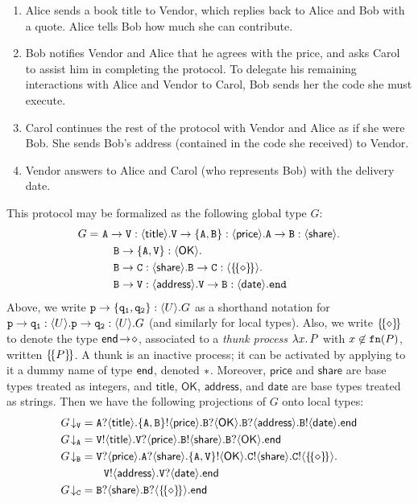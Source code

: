 \documentclass[runningheads,plain]{llncs}
\begin{document}
\begin{enumerate}[1.]
\item Alice sends a book title to Vendor, which replies back to Alice and Bob with a quote. Alice tells Bob how much she can contribute.
\item Bob notifies Vendor and Alice that he agrees with the price, and asks Carol to assist him in completing the protocol. 
To delegate his remaining interactions with Alice and Vendor to Carol, Bob sends her %
the code she must execute.
\item Carol continues the rest of the protocol with Vendor and Alice as if she were Bob. 
She sends Bob's address (contained in the  code she received) to Vendor.
\item Vendor answers to Alice and Carol (who represents Bob) with the delivery date.
\end{enumerate}
This protocol may be formalized as the following global type $G$:
\begin{align*}
G = ~&  \mathtt{A}\to\mathtt{\mathtt{V}}:\langle \mathsf{title}\rangle.\mathtt{\mathtt{V}}\to\mathtt{\{A,B\}}:\langle \mathsf{price}\rangle.\mathtt{A}\to\mathtt{B}:\langle \mathsf{share}\rangle.
\\
& \quad \mathtt{B}\to\mathtt{\{A,\mathtt{V}\}}:\langle \mathsf{OK}\rangle.
\\
& \quad \mathtt{B}\to\mathtt{C}:\langle \mathsf{share}\rangle.\mathtt{B}\to\mathtt{C}:\langle \{\!\{\diamond\}\!\}\rangle.
\\
& \quad \mathtt{B}\to\mathtt{\mathtt{V}}:\langle \mathsf{address}\rangle.\mathtt{\mathtt{V}}\to\mathtt{B}:\langle \mathsf{date}\rangle.\mathtt{end}
\end{align*}
Above, we   write
$\mathtt{\mathtt{p}}\to\mathtt{\{\mathtt{q}_1,\mathtt{q}_2\}}:\langle U\rangle.G$
as a shorthand notation for 
$\mathtt{\mathtt{p}}\to\mathtt{\mathtt{q}_1}:\langle U\rangle.\mathtt{\mathtt{p}}\to\mathtt{\mathtt{q}_2}:\langle U\rangle.G$
(and similarly for local types).
Also, we write $\{\!\{\diamond\}\!\}$ to denote the type $\mathsf{end}\! \rightarrow\! \diamond$, associated to a \emph{thunk process} $\lambda x.\,P$ with $x \not \in \mathtt{fn}(P)$, written
$\{\!\{P\}\!\}$. A thunk is an inactive process; it can be activated by applying to it a dummy name of type $\mathsf{end}$, denoted $\ast$.
Moreover, $\mathsf{price}$ and $\mathsf{share}$ are base types treated as integers,
and $\mathsf{title}$, $\mathsf{OK}$, $\mathsf{address}$, and $\mathsf{date}$ are base types treated as strings.
Then we have the following projections of $G$ onto local types:
\begin{align*}
\tproj{G}{\pS} & = \ltinp{A}{\mathsf{title}}{\ltout{\{A,B\}}{\mathsf{price}}{\ltinp{B}{\mathsf{OK}}{\ltinp{B}{\mathsf{address}}{\ltout{B}{\mathsf{date}}{\lend}}}}}
\\
\tproj{G}{\pA} & = \ltout{\pS}{\mathsf{title}}{\ltinp{\pS}{\mathsf{price}}{\ltout{B}{\mathsf{share}}{\ltinp{B}{\mathsf{OK}}{\lend}}}}
\\
\tproj{G}{\pB} & = \ltinp{\pS}{\mathsf{price}}{\ltinp{A}{\mathsf{share}}{\ltout{\{A,\pS\}}{\mathsf{OK}}{
\ltout{C}{\mathsf{share}}{\ltout{C}{\thunkt}{
\\
& \qquad \ltout{\pS}{\mathsf{address}}{\ltinp{\pS}{\mathsf{date}}{\lend}}}}}}}
\\
\tproj{G}{\pC} & = \ltinp{B}{\mathsf{share}}{\ltinp{B}{\thunkt}{\lend}}
\end{align*}
\end{document}
